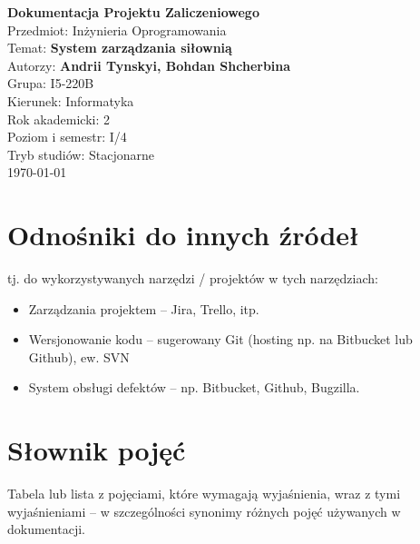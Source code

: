 \documentclass[a4paper,12pt]{article}
\begin{document}
\begin{titlepage}
    \centering
    \vspace*{5cm}
    {\Huge \textbf{Dokumentacja Projektu Zaliczeniowego}}\\[1.5cm]
    {\LARGE Przedmiot: Inżynieria Oprogramowania}\\[1cm]
    {\Large Temat: \textbf{System zarządzania siłownią}}\\[1cm]
    {\Large Autorzy: \textbf{Andrii Tynskyi, Bohdan Shcherbina}}\\[1cm]
    {\Large Grupa: I5-220B}\\[1cm]
    {\Large Kierunek: Informatyka}\\[1cm]
    {\Large Rok akademicki: 2}\\[1cm]
    {\Large Poziom i semestr: I/4}\\[1cm]
    {\Large Tryb studiów: Stacjonarne}\\[1cm]
    \vfill
    {\large \today}
\end{titlepage}



\renewcommand{\contentsname}{Spis treści}
\tableofcontents
\newpage


\section{Odnośniki do innych źródeł}
tj. do wykorzystywanych narzędzi / projektów w tych narzędziach:

\begin{itemize}
    \item Zarządzania projektem – Jira, Trello, itp.
    \item Wersjonowanie kodu – sugerowany Git (hosting np. na Bitbucket lub Github), ew. SVN
    \item System obsługi defektów – np. Bitbucket, Github, Bugzilla.
\end{itemize}

\newpage

\section{Słownik pojęć}
Tabela lub lista z pojęciami, które wymagają wyjaśnienia, wraz z tymi wyjaśnieniami – w szczególności synonimy różnych pojęć używanych w dokumentacji.
\end{document}
